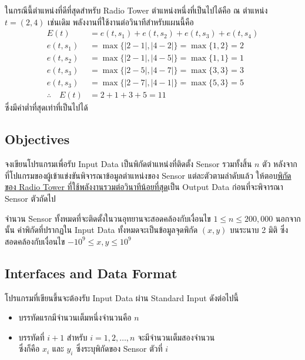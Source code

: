 \begin{enumerate}
        ในกรณีนี้ตำแหน่งที่ดีที่สุดสำหรับ Radio Tower ตำแหน่งหนึ่งที่เป็นไปได้คือ ณ ตำแหน่ง $t = (2, 4)$ เช่นเดิม \; พลังงานที่ใช้งานต่อวินาทีสำหรับแผนนี้คือ
        \begin{align*}
            E(t) &= e(t, s_1) + e(t, s_2) + e(t, s_3) + e(t, s_4) \\
            e(t, s_1) &= \max\{|2 - 1|, |4 - 2|\} = \max\{1, 2\} = 2 \\
            e(t, s_2) &= \max\{|2 - 1|, |4 - 5|\} = \max\{1, 1\} = 1 \\
            e(t, s_3) &= \max\{|2 - 5|, |4 - 7|\} = \max\{3, 3\} = 3 \\
            e(t, s_3) &= \max\{|2 - 7|, |4 - 1|\} = \max\{5, 3\} = 5 \\
            \therefore\quad E(t) &= 2 + 1 + 3 + 5 = 11
        \end{align*}
        ซึ่งมีค่าต่ำที่สุดเท่าที่เป็นไปได้
\end{enumerate}


\subsection{Objectives}

จงเขียนโปรแกรมเพื่อรับ Input Data เป็นพิกัดตำแหน่งที่ติดตั้ง Sensor รวมทั้งสิ้น $n$ ตัว \; 
หลังจากที่โปแกรมของผู้เข้าแข่งขันพิจารณาข้อมูลตำแหน่งของ Sensor แต่ละตัวตามลำดับแล้ว ให้ตอบ\uline{พิกัดของ Radio Tower ที่ใช้พลังงานรวมต่อวินาทีน้อยที่สุด}เป็น Output Data ก่อนที่จะพิจารณา Sensor ตัวถัดไป \;

จำนวน Sensor ทั้งหมดที่จะติดตั้งในวนอุทยานจะสอดคล้องกับเงื่อนไข $1 \leq n \leq 200,\!000$ นอกจากนั้น ค่าพิกัดที่ปรากฏใน Input Data ทั้งหมดจะเป็นข้อมูลจุดพิกัด $(x,y)$ บนระนาบ 2 มิติ ซึ่งสอดคล้องกับเงื่อนไข $-10^9 \leq x, y \leq 10^9$


\subsection{Interfaces and Data Format}

\noindent
โปรแกรมที่เขียนขึ้นจะต้องรับ Input Data ผ่าน Standard Input ดังต่อไปนี้

\begin{itemize}
    \item
        บรรทัดแรกมีจำนวนเต็มหนึ่งจำนวนคือ $n$ 
    \item 
        บรรทัดที่ $i+1$ สำหรับ $i = 1, 2, \ldots, n$ จะมีจำนวนเต็มสองจำนวน \\
        ซึ่งก็คือ $x_i$ และ $y_i$ ซึ่งระบุพิกัดของ Sensor ตัวที่ $i$
\end{itemize}

